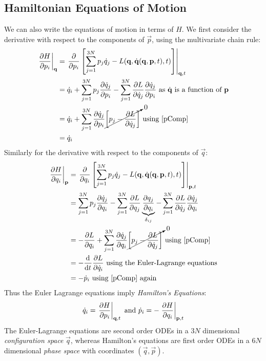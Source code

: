 \documentclass[../main.tex]{subfiles}
\begin{document}
\subsection{Hamiltonian Equations of Motion}
We can also write the equations of motion in terms of $H$.
We first consider the derivative with respect to the components of $\vec{p}$, using the multivariate chain rule:
\begin{align*}
  \at{\pderiv{H}{p_i}}{\vec{q}} &= \at{\pderiv{}{p_i}\left[\sum_{j = 1}^{3N} p_j \dot{q}_j - L(\vec{q}, \dot{\vec{q}}(\vec{q}, \vec{p}, t), t)\right]}{\vec{q}, t} \\
                                &= \dot{q}_i + \sum_{j = 1}^{3N}  p_j \pderiv{\dot{q}_j}{p_i} - \sum_{j = 1}^{3N} \pderiv{L}{\dot{q}_j} \pderiv{\dot{q}_j}{p_i} \text{ as $\dot{\vec{q}}$ is a function of $\vec{p}$} \\
                                &= \dot{q}_i + \sum_{j = 1}^{3N} \pderiv{\dot{q}_j}{p_i}\cancelto{0}{\left[p_j - \pderiv{L}{\dot{q}_j}\right]} \text{ using \cref{pComp}} \\
                                &= \dot{q}_i
\end{align*}
Similarly for the derivative with respect to the components of $\vec{q}$:
\begin{align*}
  \at{\pderiv{H}{q_i}}{\vec{p}} &= \at{\pderiv{}{q_i}\left[\sum_{j = 1}^{3N} p_j \dot{q}_j - L(\vec{q}, \dot{\vec{q}}(\vec{q}, \vec{p}, t), t)\right]}{\vec{p}, t}\\
                                &= \sum_{j = 1}^{3N} p_j \pderiv{\dot{q}_j}{q_i} - \sum_{j = 1}^{3N} \pderiv{L}{q_j} \underbrace{\pderiv{q_j}{q_i}}_{\delta_{ij}}  - \sum_{j = 1}^{3N} \pderiv{L}{\dot{q}_j} \pderiv{\dot{q}_j}{q_i} \\
                                &= - \pderiv{L}{q_i} + \sum_{j = 1}^{3N} \pderiv{\dot{q}_j}{q_i}\cancelto{0}{\left[p_j - \pderiv{L}{\dot{q}_j}\right]} \text{ using \cref{pComp}} \\
                                &= - \deriv{}{t} \pderiv{L}{\dot{q}_i} \text{ using the Euler-Lagrange equations} \\
                                &= - \dot{p}_i \text{ using \cref{pComp} again}
\end{align*}
Thus the Euler Lagrange equations imply \textit{Hamilton's Equations}:
\begin{equation}
  \dot{q}_i = \at{\pderiv{H}{p_i}}{\vec{q}, t} \text{ and } \dot{p}_i = -\at{\pderiv{H}{q_i}}{\vec{p}, t} \label{hamiltonsEqs}
\end{equation}
The Euler-Lagrange equations are second order ODEs in a $3N$ dimensional \textit{configuration space} $\vec{q}$, whereas Hamilton's equations are first order ODEs in a $6N$ dimensional \textit{phase space} with coordinates $(\vec{q}, \vec{p})$.
\end{document}
